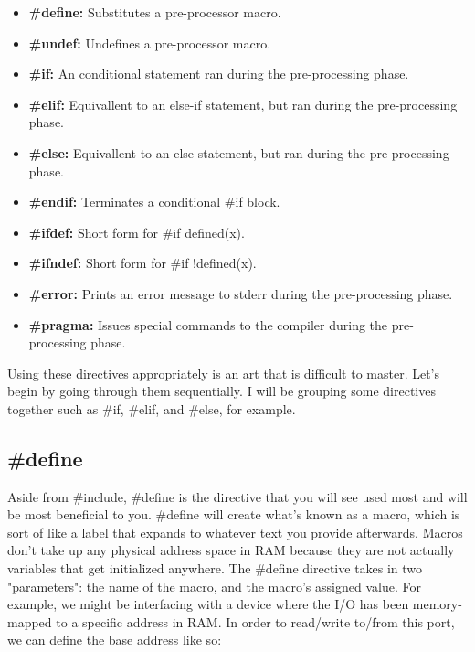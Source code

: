 \documentclass{article}
\begin{document}
\begin{itemize}
    \item{\textbf{\#define:} Substitutes a pre-processor macro.}

    \item{\textbf{\#undef:} Undefines a pre-processor macro.}

    \item{\textbf{\#if:} An conditional statement ran during the pre-processing phase.}

    \item{\textbf{\#elif:} Equivallent to an else-if statement, but ran during the pre-processing phase.}

    \item{\textbf{\#else:} Equivallent to an else statement, but ran during the pre-processing phase.}

    \item{\textbf{\#endif:} Terminates a conditional \#if block.}

    \item{\textbf{\#ifdef:} Short form for \#if defined(x).}

    \item{\textbf{\#ifndef:} Short form for \#if !defined(x).}

    \item{\textbf{\#error:} Prints an error message to stderr during the pre-processing phase.}

    \item{\textbf{\#pragma:} Issues special commands to the compiler during the pre-processing phase.}
\end{itemize}

Using these directives appropriately is an art that is difficult to master. Let’s begin by going through them
sequentially. I will be grouping some directives together such as \#if, \#elif, and \#else, for example.

\subsection{\#define}

Aside from \#include, \#define is the directive that you will see used most and will be most beneficial to you.
\#define will create what’s known as a macro, which is sort of like a label that expands to whatever text you
provide afterwards. Macros don’t take up any physical address space in RAM because they are not actually
variables that get initialized anywhere. The \#define directive takes in two "parameters": the name of the
macro, and the macro’s assigned value. For example, we might be interfacing with a device where the I/O has been
memory-mapped to a specific address in RAM. In order to read/write to/from this port, we can define the base
address like so:
\end{document}
